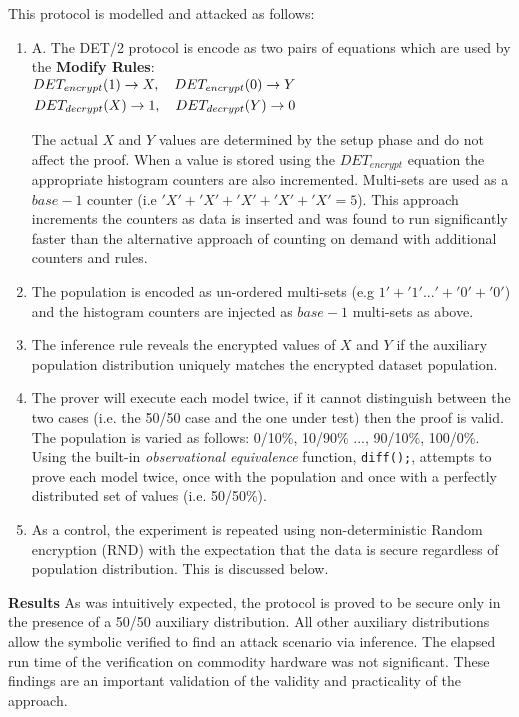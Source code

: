 \documentclass[journal]{IEEEtran}
\begin{document}
This protocol is modelled and attacked as follows:
\begin{enumerate}[label=(\Alph*)]
        \item A. The DET/2 protocol is encode as two pairs of equations which are used by the \textbf{Modify Rules}:\\
        
    
    $\begin{aligned} DET_{encrypt}(1) \rightarrow X,\quad	DET_{encrypt}(0) \rightarrow Y\\
    DET_{decrypt}(X) \rightarrow  1,\quad   DET_{decrypt}(Y) \rightarrow  0 \end{aligned}\\$
    
    The actual $X$ and $Y$ values are determined by the setup phase and do not affect the proof.
	When a value is stored using the $DET_{encrypt}$ equation the appropriate histogram counters are also incremented. Multi-sets are used as a $base-1$ counter (i.e $'X'+'X'+'X'+'X'+'X' = 5$).  This approach increments the counters as data is inserted and was found to run significantly faster than the alternative approach of counting on demand with additional counters and rules.
\item The \aux{} population is encoded as un-ordered multi-sets (e.g $ 1' + '1' ... ' + '0' + '0'$) and the \aux{} histogram counters are injected as $base-1$ multi-sets as above. 
\item The inference rule reveals the encrypted values of $X$ and $Y$ if the auxiliary population distribution uniquely matches the encrypted dataset population.
\item The prover will execute each model twice, if it cannot distinguish between the two cases (i.e. the 50/50 case and the one under test) then the proof is valid. The population is varied as follows: 0/10\%, 10/90\% ..., 90/10\%, 100/0\%. 
Using the built-in \textit{observational equivalence} function, \texttt{diff();}, \tamarin{} attempts to prove each model twice, once with the \aux{} population and once with a perfectly distributed set of values (i.e. 50/50\%). 
\item As a control, the experiment is repeated using non-deterministic Random encryption (RND) with the expectation that the data is secure regardless of population distribution. This is discussed below.
\end{enumerate}
\textbf{Results} As was intuitively expected, the protocol is proved to be secure only in the presence of a 50/50 auxiliary distribution. All other auxiliary distributions allow the symbolic verified to find an attack scenario via inference. The elapsed run time of the verification on commodity hardware was not significant. These findings are an important validation of the validity and practicality of the approach.
\end{document}
